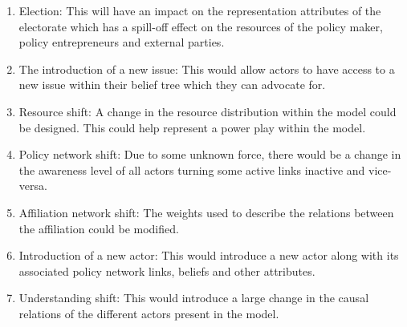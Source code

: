 \begin{enumerate}
\item Election: This will have an impact on the representation attributes of the electorate which has a spill-off effect on the resources of the policy maker, policy entrepreneurs and external parties.
\item The introduction of a new issue: This would allow actors to have access to a new issue within their belief tree which they can advocate for.
\item Resource shift: A change in the resource distribution within the model could be designed. This could help represent a power play within the model.
\item Policy network shift: Due to some unknown force, there would be a change in the awareness level of all actors turning some active links inactive and vice-versa.
\item Affiliation network shift: The weights used to describe the relations between the affiliation could be modified.
\item Introduction of a new actor: This would introduce a new actor along with its associated policy network links, beliefs and other attributes.
\item Understanding shift: This would introduce a large change in the causal relations of the different actors present in the model.
\end{enumerate}


